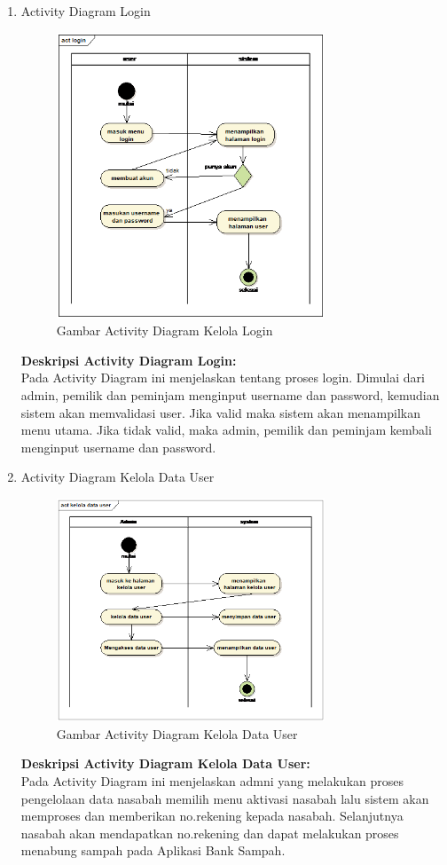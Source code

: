 \begin{enumerate}
\item Activity Diagram Login
\hfill\\
	\begin{figure}[H]
		\includegraphics[width=8cm]{figures/analisis/11.png}
		\centering
		\caption{Gambar Activity Diagram Kelola Login}
	\end{figure}
\textbf{Deskripsi Activity Diagram Login:}
\hfill\\
Pada Activity Diagram ini menjelaskan tentang proses login. Dimulai dari admin, pemilik dan peminjam menginput username dan password, kemudian sistem akan memvalidasi user. Jika valid maka sistem akan menampilkan menu utama. Jika tidak valid, maka admin, pemilik dan peminjam kembali menginput username dan password.	
	
\item Activity Diagram Kelola Data User
\hfill\\
	\begin{figure}[H]
		\includegraphics[width=8cm]{figures/analisis/12.png}
		\centering
		\caption{Gambar Activity Diagram Kelola Data User}
	\end{figure}
\textbf{Deskripsi Activity Diagram Kelola Data User:}
\hfill\\
Pada Activity Diagram ini menjelaskan admni yang melakukan proses pengelolaan data nasabah memilih menu aktivasi nasabah lalu sistem akan memproses dan memberikan no.rekening kepada nasabah. Selanjutnya nasabah akan mendapatkan no.rekening dan dapat melakukan proses menabung sampah pada Aplikasi Bank Sampah.
	

\end{enumerate}
